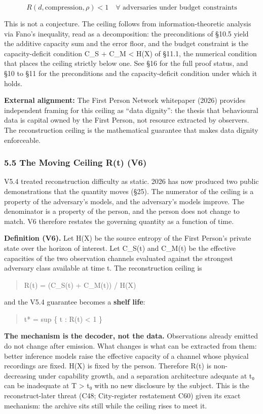 \documentclass[
  11pt,
]{article}
\begin{document}
\[R(d, \text{compression}, \rho) < 1 \quad \forall \text{ adversaries under budget constraints}\]

This is not a conjecture. The ceiling follows from information-theoretic
analysis via Fano's inequality, read as a decomposition: the
preconditions of §10.5 yield the additive capacity sum and the error
floor, and the budget constraint is the capacity-deficit condition C\_S
+ C\_M \textless{} H(X) of §11.1, the numerical condition that places
the ceiling strictly below one. See §16 for the full proof status, and
§10 to §11 for the preconditions and the capacity-deficit condition
under which it holds.

\textbf{External alignment:} The First Person Network whitepaper (2026)
provides independent framing for this ceiling as ``data dignity'': the
thesis that behavioural data is capital owned by the First Person, not
resource extracted by observers. The reconstruction ceiling is the
mathematical guarantee that makes data dignity enforceable.

\subsubsection{5.5 The Moving Ceiling R(t)
(V6)}\label{the-moving-ceiling-rt-v6}

V5.4 treated reconstruction difficulty as static. 2026 has now produced
two public demonstrations that the quantity moves (§25). The numerator
of the ceiling is a property of the adversary's models, and the
adversary's models improve. The denominator is a property of the person,
and the person does not change to match. V6 therefore restates the
governing quantity as a function of time.

\textbf{Definition (V6).} Let H(X) be the source entropy of the First
Person's private state over the horizon of interest. Let C\_S(t) and
C\_M(t) be the effective capacities of the two observation channels
evaluated against the strongest adversary class available at time t. The
reconstruction ceiling is

\begin{quote}
R(t) = (C\_S(t) + C\_M(t)) / H(X)
\end{quote}

and the V5.4 guarantee becomes a \textbf{shelf life}:

\begin{quote}
t* = sup \{ t : R(t) \textless{} 1 \}
\end{quote}

\textbf{The mechanism is the decoder, not the data.} Observations
already emitted do not change after emission. What changes is what can
be extracted from them: better inference models raise the effective
capacity of a channel whose physical recordings are fixed. H(X) is fixed
by the person. Therefore R(t) is non-decreasing under capability growth,
and a separation architecture adequate at t₀ can be inadequate at T
\textgreater{} t₀ with no new disclosure by the subject. This is the
reconstruct-later threat (C48; City-register restatement C60) given its
exact mechanism: the archive sits still while the ceiling rises to meet
it.
\end{document}
